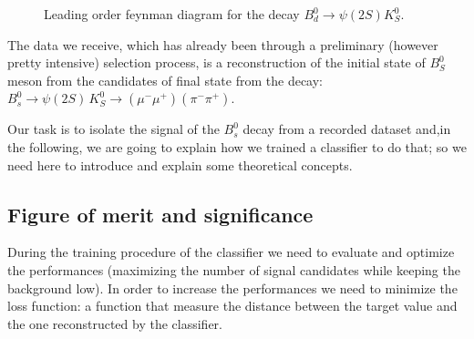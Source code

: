 \begin{figure}[H]
    \centering
\caption{Leading order feynman diagram for the decay $B_d^{0} \xrightarrow{} \psi(2S)K^{0}_{S}$.}
\end{figure}
The data we receive, which has already been through a preliminary (however pretty intensive) selection process, is a reconstruction of the initial state of $B^{0}_{S}$ meson from the candidates of final state from the decay: $B_s^0 \rightarrow \psi(2S)\,K_S^0 \rightarrow (\mu^-\mu^+) (\pi^-\pi^+)$.

Our task is to isolate the signal of the $B_s^0$ decay from a recorded dataset and,in the following, we are going to explain how we trained a classifier to do that; so we need here to introduce and explain some theoretical concepts.

\subsection{Figure of merit and significance}

During the training procedure of the classifier we need to evaluate and optimize the performances (maximizing the number of signal candidates while keeping the background low).
In order to increase the performances we need to minimize the loss function: a function that measure the distance between the target value and the one reconstructed by the classifier.

